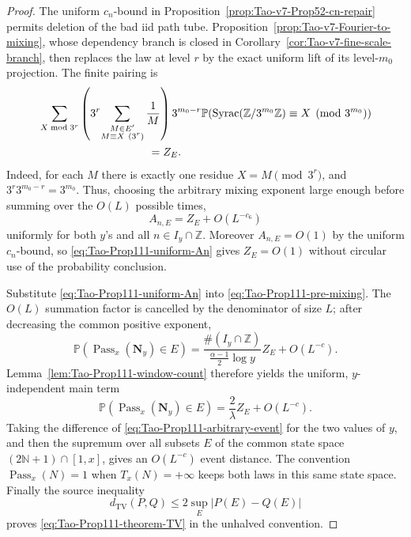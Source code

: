 \begin{proof}
The uniform \(c_n\)-bound in
Proposition~\ref{prop:Tao-v7-Prop52-cn-repair} permits deletion of the bad
iid path tube.  Proposition~\ref{prop:Tao-v7-Fourier-to-mixing}, whose
dependency branch is closed in
Corollary~\ref{cor:Tao-v7-fine-scale-branch}, then replaces the law at level
\(r\) by the exact uniform lift of its level-\(m_0\) projection.  The finite
pairing is
\begin{equation}
\label{eq:Tao-Prop111-exact-collapse}
\begin{split}
 &\sum_{X\bmod3^r}
 \left(3^r\!\sum_{\substack{M\in E'\\M\equiv X\ (3^r)}}\frac1M\right)
 3^{m_0-r}
 \mathbb P\!\left(
  \operatorname{Syrac}(\mathbb Z/3^{m_0}\mathbb Z)
  \equiv X\pmod{3^{m_0}}
 \right)\\
 &\hspace{35mm}=Z_E.
\end{split}
\end{equation}
Indeed, for each \(M\) there is exactly one residue
\(X=M\pmod{3^r}\), and \(3^r3^{m_0-r}=3^{m_0}\).  Thus, choosing the
arbitrary mixing exponent large enough before summing over the
\(O(L)\) possible times,
\begin{equation}
\label{eq:Tao-Prop111-uniform-An}
 A_{n,E}=Z_E+O(L^{-c_6})
\end{equation}
uniformly for both \(y\)'s and all \(n\in I_y\cap\mathbb Z\).  Moreover
\(A_{n,E}=O(1)\) by the uniform \(c_n\)-bound, so
\eqref{eq:Tao-Prop111-uniform-An} gives \(Z_E=O(1)\) without circular use
of the probability conclusion.

Substitute \eqref{eq:Tao-Prop111-uniform-An} into
\eqref{eq:Tao-Prop111-pre-mixing}.  The \(O(L)\) summation factor is
cancelled by the denominator of size \(L\); after decreasing the common
positive exponent,
\[
 \mathbb P(\operatorname{Pass}_x(\mathbf N_y)\in E)
 =\frac{\#(I_y\cap\mathbb Z)}
        {\frac{\alpha-1}{2}\log y}Z_E+O(L^{-c}).
\]
Lemma~\ref{lem:Tao-Prop111-window-count} therefore yields the uniform,
\(y\)-independent main term
\begin{equation}
\label{eq:Tao-Prop111-arbitrary-event}
 \mathbb P(\operatorname{Pass}_x(\mathbf N_y)\in E)
 =\frac{2}{\lambda}Z_E+O(L^{-c}).
\end{equation}
Taking the difference of \eqref{eq:Tao-Prop111-arbitrary-event} for the two
values of \(y\), and then the supremum over all subsets \(E\) of the common
state space \((2\mathbb N+1)\cap[1,x]\), gives an \(O(L^{-c})\) event
distance.  The convention \(\operatorname{Pass}_x(N)=1\) when
\(T_x(N)=+\infty\) keeps both laws in this same state space.  Finally the
source inequality
\[
 d_{\mathrm{TV}}(P,Q)
 \le2\sup_E|P(E)-Q(E)|
\]
proves \eqref{eq:Tao-Prop111-theorem-TV} in the unhalved convention.
\end{proof}

